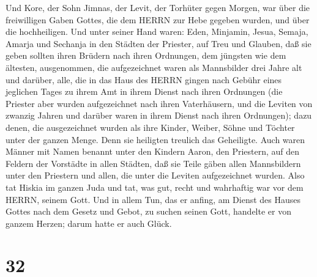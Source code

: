 Und Kore, der Sohn Jimnas, der Levit, der Torhüter gegen Morgen, war
über die freiwilligen Gaben Gottes, die dem HERRN zur Hebe gegeben
wurden, und über die hochheiligen.  Und unter seiner Hand
waren: Eden, Minjamin, Jesua, Semaja, Amarja und Sechanja in den Städten
der Priester, auf Treu und Glauben, daß sie geben sollten ihren Brüdern
nach ihren Ordnungen, dem jüngsten wie dem ältesten, 
ausgenommen, die aufgezeichnet waren als Mannsbilder drei Jahre alt und
darüber, alle, die in das Haus des HERRN gingen nach Gebühr eines
jeglichen Tages zu ihrem Amt in ihrem Dienst nach ihren Ordnungen
 (die Priester aber wurden aufgezeichnet nach ihren
Vaterhäusern, und die Leviten von zwanzig Jahren und darüber waren in
ihrem Dienst nach ihren Ordnungen);  dazu denen, die
ausgezeichnet wurden als ihre Kinder, Weiber, Söhne und Töchter unter
der ganzen Menge. Denn sie heiligten treulich das Geheiligte.
 Auch waren Männer mit Namen benannt unter den Kindern
Aaron, den Priestern, auf den Feldern der Vorstädte in allen Städten,
daß sie Teile gäben allen Mannsbildern unter den Priestern und allen,
die unter die Leviten aufgezeichnet wurden.  Also tat
Hiskia im ganzen Juda und tat, was gut, recht und wahrhaftig war vor dem
HERRN, seinem Gott.  Und in allem Tun, das er anfing, am
Dienst des Hauses Gottes nach dem Gesetz und Gebot, zu suchen seinen
Gott, handelte er von ganzem Herzen; darum hatte er auch Glück.

\hypertarget{section-31}{%
\section{32}\label{section-31}}

